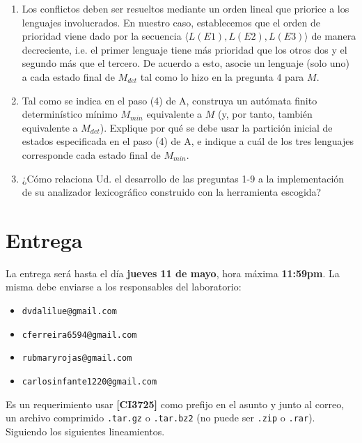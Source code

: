 \documentclass[letterpaper,10pt]{article}
\newcommand{\ttt}[1]{\texttt{#1}}
\begin{document}
\begin{enumerate}
    \item Los conflictos deben ser resueltos mediante un orden lineal que priorice a los lenguajes involucrados. En nuestro caso, establecemos que el orden de prioridad viene dado por la secuencia $\langle L(E1), L(E2), L(E3)\rangle$ de manera decreciente, i.e. el primer lenguaje tiene más prioridad que los otros dos y el segundo más que el tercero. De acuerdo a esto, asocie un lenguaje (solo uno) a cada estado final de $M_{det}$ tal como lo hizo en la pregunta 4 para $M$.
    
    \item Tal como se indica en el paso (4) de A, construya un autómata finito determinístico mínimo $M_{min}$ equivalente a $M$ (y, por tanto, también equivalente a $M_{det}$). Explique por qué se debe usar la partición inicial de estados especificada en el paso (4) de A, e indique a cuál de los tres lenguajes corresponde cada estado final de $M_{min}$.
    
    \item ¿Cómo relaciona Ud. el desarrollo de las preguntas 1-9 a la implementación de su analizador lexicográfico construido con la herramienta escogida?
\end{enumerate}

\section{Entrega}

La entrega será hasta el día \textbf{jueves 11 de mayo}, hora máxima \textbf{11:59pm}. La misma debe enviarse a los responsables del laboratorio:

\begin{itemize}
    \item[]   \ttt{dvdalilue@gmail.com}
    \item[]   \ttt{cferreira6594@gmail.com}
    \item[]   \ttt{rubmaryrojas@gmail.com }
    \item[]   \ttt{carlosinfante1220@gmail.com }
\end{itemize}

Es un requerimiento usar \textbf{[CI3725]} como prefijo en el asunto y junto al correo, un archivo comprimido \texttt{.tar.gz} o \texttt{.tar.bz2} (no puede ser \texttt{.zip} o \texttt{.rar}). Siguiendo los siguientes lineamientos.
\end{document}
